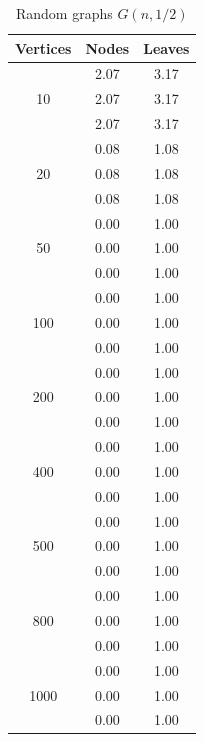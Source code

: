 \begin{table}[h]
    \centering
    \begin{tabular}{ccc}
    \toprule
    Vertices & Nodes & Leaves \\
    \midrule
    \multirow{3}{*}{10} & 2.07 & 3.17 \\
     & 2.07 & 3.17 \\
     & 2.07 & 3.17 \\
    \cmidrule(lr){1-3}
    \multirow{3}{*}{20} & 0.08 & 1.08 \\
     & 0.08 & 1.08 \\
     & 0.08 & 1.08 \\
    \cmidrule(lr){1-3}
    \multirow{3}{*}{50} & 0.00 & 1.00 \\
     & 0.00 & 1.00 \\
     & 0.00 & 1.00 \\
    \cmidrule(lr){1-3}
    \multirow{3}{*}{100} & 0.00 & 1.00 \\
     & 0.00 & 1.00 \\
     & 0.00 & 1.00 \\
    \cmidrule(lr){1-3}
    \multirow{3}{*}{200} & 0.00 & 1.00 \\
     & 0.00 & 1.00 \\
     & 0.00 & 1.00 \\
    \cmidrule(lr){1-3}
    \multirow{3}{*}{400} & 0.00 & 1.00 \\
     & 0.00 & 1.00 \\
     & 0.00 & 1.00 \\
    \cmidrule(lr){1-3}
    \multirow{3}{*}{500} & 0.00 & 1.00 \\
     & 0.00 & 1.00 \\
     & 0.00 & 1.00 \\
    \cmidrule(lr){1-3}
    \multirow{3}{*}{800} & 0.00 & 1.00 \\
     & 0.00 & 1.00 \\
     & 0.00 & 1.00 \\
    \cmidrule(lr){1-3}
    \multirow{3}{*}{1000} & 0.00 & 1.00 \\
     & 0.00 & 1.00 \\
     & 0.00 & 1.00 \\
    \bottomrule
    \end{tabular}
    \caption{Random graphs $G(n, 1/2)$}
\end{table}
